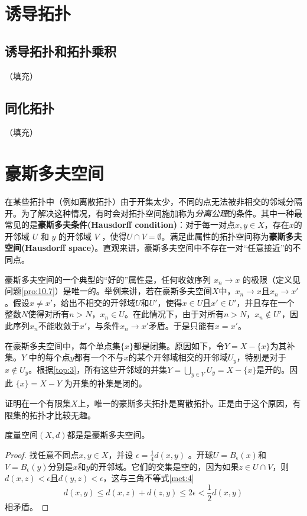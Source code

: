 \section{诱导拓扑}
\subsection{诱导拓扑和拓扑乘积}
（填充）
\subsection{同化拓扑}
（填充）
\section{豪斯多夫空间}

在某些拓扑中（例如离散拓扑）由于开集太少，不同的点无法被非相交的邻域分隔开。为了解决这种情况，有时会对拓扑空间施加称为\emph{分离公理}的条件。其中一种最常见的是\textbf{豪斯多夫条件(Hausdorff condition)}：对于每一对点$x,y\in X$，存在$x$的开邻域 $U$ 和 $y$ 的开邻域 $V$ ，使得$U\cap V=\emptyset $。满足此属性的拓扑空间称为\textbf{豪斯多夫空间(Hausdorff space)}。直观来讲，豪斯多夫空间中不存在一对“任意接近”的不同点。

豪斯多夫空间的一个典型的“好的”属性是，任何收敛序列 $x_{n}\rightarrow x$ 的极限（定义见问题\ref{pro:10.7}）是唯一的。举例来讲，若在豪斯多夫空间$X$中，$x_{n}\rightarrow x$且$x_{n}\rightarrow x'$。假设$x\neq x'$，给出不相交的开邻域$U$和$U'$，使得$x\in U$且$x'\in U'$，并且存在一个整数$N$使得对所有$n >N$，$x_{n} \in U$。在此情况下，由于对所有$n >N$，$x_{n} \notin U'$，因此序列$x_{n}$不能收敛于$x'$，与条件$x_{n}\rightarrow x'$矛盾。于是只能有$x=x'$。

在豪斯多夫空间中，每个单点集$\{x\}$都是闭集。原因如下，令$Y=X-\{x\}$为其补集。$Y$ 中的每个点$y$都有一个不与$x$的某个开邻域相交的开邻域$U_{y}$，特别是对于$x\notin U_{y}$。根据\ref{top:3}，所有这些开邻域的并集$Y=\bigcup _{y\in Y} U_{y} =X-\{x\}$是开的。因此 $\{x\}=X-Y$ 为开集的补集是闭的。

\begin{exercise}
	证明在一个有限集$X$上，唯一的豪斯多夫拓扑是离散拓扑。正是由于这个原因，有限集的拓扑才比较无趣。
\end{exercise}

\begin{theorem}\label{eg:10.4}
	度量空间$(X,d)$都是是豪斯多夫空间。
\end{theorem}

\begin{proof}
	找任意不同点$x,y\in X$，并设 $\epsilon =\frac{1}{4} d(x,y)$ 。开球$U=B_{\epsilon } (x)$和$V=B_{\epsilon } (y)$分别是$x$和$y$的开邻域。它们的交集是空的，因为如果$z\in U\cap V$，则$d(x,z)< \epsilon $且$d(y,z)< \epsilon $，这与三角不等式\ref{met:4}
\begin{equation*}
    d(x,y)\leq d(x,z)+d(z,y)\leq 2\epsilon < \frac{1}{2} d(x,y)
\end{equation*}
相矛盾。
\end{proof}


